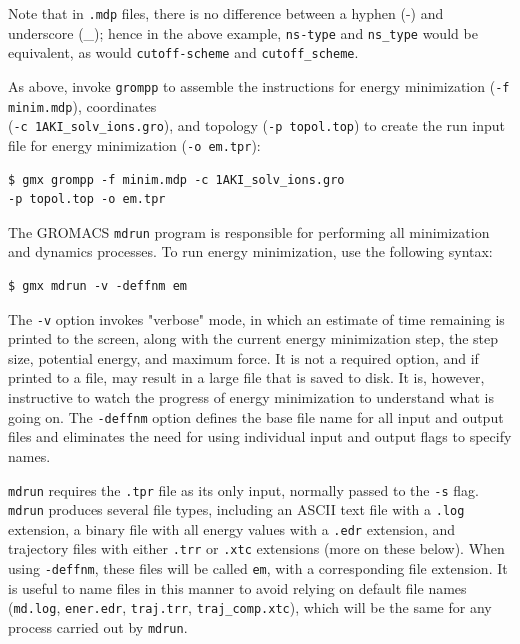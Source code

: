 \documentclass[9pt,tutorial]{livecoms}
\begin{document}
Note that in \texttt{.mdp} files, there is no difference between a hyphen (-) and underscore (\_); hence in the above example, \texttt{ns-type} and \texttt{ns\_type} would be equivalent, as would \texttt{cutoff-scheme} and \texttt{cutoff\_scheme}.

As above, invoke \texttt{grompp} to assemble the instructions for energy minimization (\texttt{-f minim.mdp}), coordinates \\(\texttt{-c 1AKI\_solv\_ions.gro}), and topology (\texttt{-p topol.top}) to create the run input file for energy minimization (\texttt{-o em.tpr}):

\begin{verbatim}
$ gmx grompp -f minim.mdp -c 1AKI_solv_ions.gro 
-p topol.top -o em.tpr
\end{verbatim}

The GROMACS \texttt{mdrun} program is responsible for performing all minimization and dynamics processes. To run energy minimization, use the following syntax:

\begin{verbatim}
$ gmx mdrun -v -deffnm em
\end{verbatim}

The \texttt{-v} option invokes "verbose" mode, in which an estimate of time remaining is printed to the screen, along with the current energy minimization step, the step size, potential energy, and maximum force. It is not a required option, and if printed to a file, may result in a large file that is saved to disk. It is, however, instructive to watch the progress of energy minimization to understand what is going on. The \texttt{-deffnm} option defines the base file name for all input and output files and eliminates the need for using individual input and output flags to specify names. 

\texttt{mdrun} requires the \texttt{.tpr} file as its only input, normally passed to the \texttt{-s} flag. \texttt{mdrun} produces several file types, including an ASCII text file with a \texttt{.log} extension, a binary file with all energy values with a \texttt{.edr} extension, and trajectory files with either \texttt{.trr} or \texttt{.xtc} extensions (more on these below). When using \texttt{-deffnm}, these files will be called \texttt{em}, with a corresponding file extension. It is useful to name files in this manner to avoid relying on default file names (\texttt{md.log}, \texttt{ener.edr}, \texttt{traj.trr}, \texttt{traj\_comp.xtc}), which will be the same for any process carried out by \texttt{mdrun}.
\end{document}

